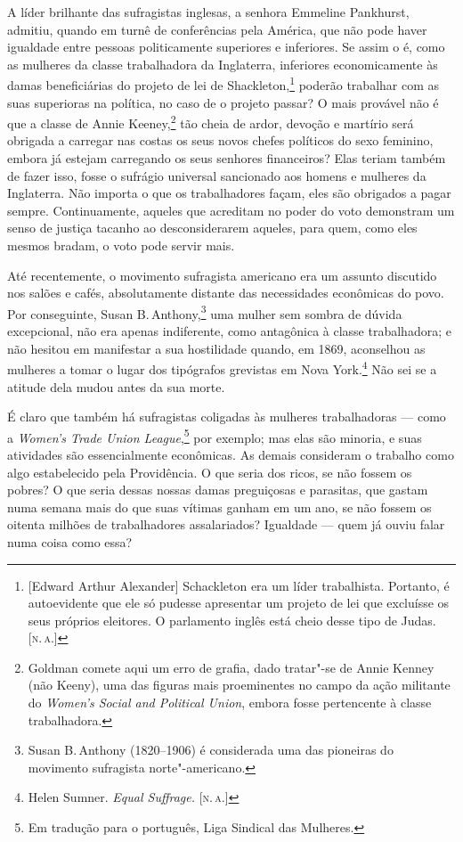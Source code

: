 A líder brilhante das sufragistas inglesas, a senhora Emmeline
Pankhurst, admitiu, quando em turnê de conferências pela América, que não
pode haver igualdade entre pessoas politicamente superiores e
inferiores. Se assim o é, como as mulheres da classe trabalhadora da
Inglaterra, inferiores economicamente às damas beneficiárias do projeto
de lei de Shackleton,\footnote{{[}Edward Arthur Alexander{]} Schackleton
  era um líder trabalhista. Portanto, é autoevidente que ele só pudesse
  apresentar um projeto de lei que excluísse os seus próprios eleitores.
  O parlamento inglês está cheio desse tipo de Judas. [\textsc{n.\,a.}]} poderão
trabalhar com as suas superioras na política, no caso de o projeto passar? %
O mais provável não é que a classe de Annie Keeney,\footnote{Goldman comete aqui um
  erro de grafia, dado tratar"-se de Annie Kenney (não Keeny), uma das
  figuras mais proeminentes no campo da ação militante do \emph{Women's
  Social and Political Union}, embora fosse pertencente à classe
  trabalhadora.} tão cheia de ardor, devoção e martírio será obrigada a
carregar nas costas os seus novos chefes políticos do sexo feminino, embora já
estejam carregando os seus senhores financeiros? Elas teriam também de
fazer isso, fosse o sufrágio universal sancionado aos homens e mulheres da
Inglaterra. Não importa o que os trabalhadores façam, eles são obrigados
a pagar sempre. Continuamente, aqueles que acreditam no poder do voto
demonstram um senso de justiça tacanho ao desconsiderarem aqueles, para
quem, como eles mesmos bradam, o voto pode servir mais.

Até recentemente, o movimento sufragista americano era um assunto
discutido nos salões e cafés, absolutamente distante das necessidades
econômicas do povo. Por conseguinte, Susan B.\,Anthony,\footnote{Susan B.\,Anthony (1820--1906) é considerada uma das pioneiras do movimento sufragista norte"-americano.} uma mulher sem
sombra de dúvida excepcional, não era apenas indiferente, como
antagônica à classe trabalhadora; e não hesitou em manifestar a sua
hostilidade quando, em 1869, aconselhou as mulheres a tomar o lugar dos
tipógrafos grevistas em Nova York.\footnote{Helen Sumner. \emph{Equal
  Suffrage.} [\textsc{n.\,a.}]} Não sei se a atitude dela mudou antes da sua morte.

É claro que também há sufragistas coligadas às mulheres trabalhadoras
--- como a \emph{Women's Trade Union League},\footnote{Em tradução para o português, Liga Sindical das
Mulheres.} por exemplo; mas elas são minoria, e suas atividades
são essencialmente econômicas. As demais consideram o trabalho como algo
estabelecido pela Providência. O que seria dos ricos, se não fossem
os pobres? O que seria dessas nossas damas preguiçosas e parasitas, que
gastam numa semana mais do que suas vítimas ganham em um ano, se não
fossem os oitenta milhões de trabalhadores assalariados? Igualdade --- quem já ouviu falar numa coisa como essa?


